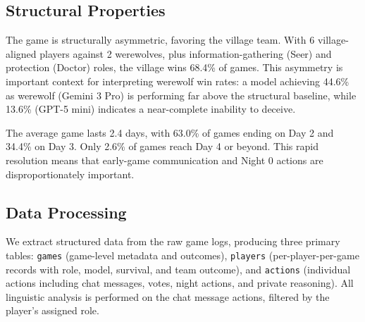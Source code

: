\subsection{Structural Properties}

The game is structurally asymmetric, favoring the village team. With 6 village-aligned players against 2 werewolves, plus information-gathering (Seer) and protection (Doctor) roles, the village wins 68.4\% of games. This asymmetry is important context for interpreting werewolf win rates: a model achieving 44.6\% as werewolf (Gemini 3 Pro) is performing far above the structural baseline, while 13.6\% (GPT-5 mini) indicates a near-complete inability to deceive.

The average game lasts 2.4 days, with 63.0\% of games ending on Day 2 and 34.4\% on Day 3. Only 2.6\% of games reach Day 4 or beyond. This rapid resolution means that early-game communication and Night 0 actions are disproportionately important.

\subsection{Data Processing}

We extract structured data from the raw game logs, producing three primary tables: \texttt{games} (game-level metadata and outcomes), \texttt{players} (per-player-per-game records with role, model, survival, and team outcome), and \texttt{actions} (individual actions including chat messages, votes, night actions, and private reasoning). All linguistic analysis is performed on the chat message actions, filtered by the player's assigned role.
